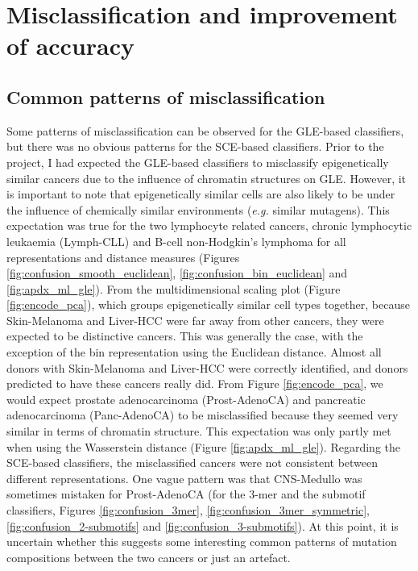 \section{Misclassification and improvement of accuracy}\label{discussion:miclassification}
\subsection{Common patterns of misclassification}
Some patterns of misclassification can be observed for the GLE-based classifiers, but there was no obvious patterns for the SCE-based classifiers. Prior to the project, I had expected the GLE-based classifiers to misclassify epigenetically similar cancers due to the influence of chromatin structures on GLE. However, it is important to note that epigenetically similar cells are also likely to be under the influence of chemically similar environments (\textit{e.g.} similar mutagens). This expectation was true for the two lymphocyte related cancers, chronic lymphocytic leukaemia (Lymph-CLL) and B-cell non-Hodgkin's lymphoma for all representations and distance measures (Figures \ref{fig:confusion_smooth_euclidean}, \ref{fig:confusion_bin_euclidean} and \ref{fig:apdx_ml_gle}). From the multidimensional scaling plot (Figure \ref{fig:encode_pca}), which groups epigenetically similar cell types together, because Skin-Melanoma and Liver-HCC were far away from other cancers, they were expected to be distinctive cancers. This was generally the case, with the exception of the bin representation using the Euclidean distance. Almost all donors with Skin-Melanoma and Liver-HCC were correctly identified, and donors predicted to have these cancers really did. From Figure \ref{fig:encode_pca}, we would expect prostate adenocarcinoma (Prost-AdenoCA) and pancreatic adenocarcinoma (Panc-AdenoCA) to be misclassified because they seemed very similar in terms of chromatin structure. This expectation was only partly met when using the Wasserstein distance (Figure \ref{fig:apdx_ml_gle}). Regarding the SCE-based classifiers, the misclassified cancers were not consistent between different representations. One vague pattern was that CNS-Medullo was sometimes mistaken for Prost-AdenoCA (for the 3-mer and the submotif classifiers, Figures \ref{fig:confusion_3mer}, \ref{fig:confusion_3mer_symmetric}, \ref{fig:confusion_2-submotifs} and \ref{fig:confusion_3-submotifs}). At this point, it is uncertain whether this suggests some interesting common patterns of mutation compositions between the two cancers or just an artefact. 

